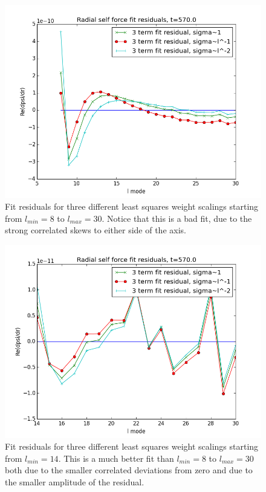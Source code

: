 \begin{figure}
\includegraphics{fitresiduals3terms570l8}
\caption{Fit residuals for three different least squares weight scalings starting from $l_{min}=8$ to $l_{max}=30$. Notice that this is a bad fit, due to the strong correlated skews to either side of the axis.}
\label{8badfit}
\end{figure}

\begin{figure}
\includegraphics{fitresidulas3terms570l14}
\caption{Fit residuals for three different least squares weight scalings starting from $l_{min}=14$. This is a much better fit than $l_{min}=8$ to $l_{max}=30$ both due to the smaller correlated deviations from zero and due to the smaller amplitude of the residual.}
\label{14goodfit}
\end{figure}

